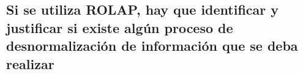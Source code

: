 \medskip
\subsection{Si se utiliza ROLAP, hay que identificar y justificar si existe algún proceso de desnormalización de información que se deba realizar}
